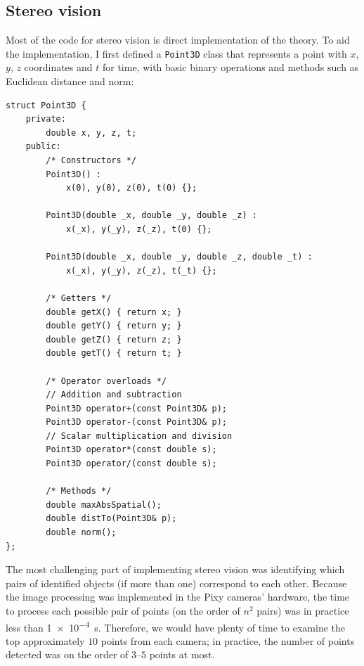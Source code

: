 \documentclass[letterpaper, 11pt]{article}
\begin{document}
\subsection{Stereo vision}
Most of the code for stereo vision is direct implementation of the theory. To aid the implementation, I first defined a \verb|Point3D| class that represents a point with $x$, $y$, $z$ coordinates and $t$ for time, with basic binary operations and methods such as Euclidean distance and norm:
\begin{verbatim}
struct Point3D {
    private:
        double x, y, z, t;
    public:
        /* Constructors */
        Point3D() :
            x(0), y(0), z(0), t(0) {};

        Point3D(double _x, double _y, double _z) :
            x(_x), y(_y), z(_z), t(0) {};

        Point3D(double _x, double _y, double _z, double _t) :
            x(_x), y(_y), z(_z), t(_t) {};

        /* Getters */
        double getX() { return x; }
        double getY() { return y; }
        double getZ() { return z; }
        double getT() { return t; }

        /* Operator overloads */
        // Addition and subtraction
        Point3D operator+(const Point3D& p);
        Point3D operator-(const Point3D& p);
        // Scalar multiplication and division
        Point3D operator*(const double s);
        Point3D operator/(const double s);

        /* Methods */
        double maxAbsSpatial();
        double distTo(Point3D& p);
        double norm();
};
\end{verbatim}
The most challenging part of implementing stereo vision was identifying which pairs of identified objects (if more than one) correspond to each other. Because the image processing was implemented in the Pixy cameras' hardware, the time to process each possible pair of points (on the order of $n^2$ pairs) was in practice less than \SI{1e-4}{s}. Therefore, we would have plenty of time to examine the top approximately $10$ points from each camera; in practice, the number of points detected was on the order of $3$--$5$ points at most.
\end{document}
